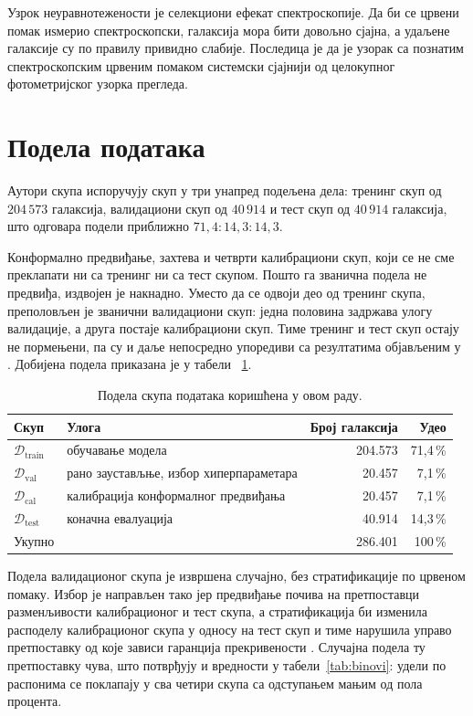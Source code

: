 \documentclass[12pt,oneside]{memoir}
\newcommand{\Dtrain}{\mathcal{D}_{\mathrm{train}}}
\newcommand{\Dval}{\mathcal{D}_{\mathrm{val}}}
\newcommand{\Dcal}{\mathcal{D}_{\mathrm{cal}}}
\newcommand{\Dtest}{\mathcal{D}_{\mathrm{test}}}
\begin{document}
Узрок неуравнотежености је селекциони ефекат спектроскопије. Да би се црвени помак 
иѕмерио спектроскопски, галаксија мора бити довољно сјајна, а удаљене галаксије су по 
правилу привидно слабије. Последица је да је узорак са познатим спектроскопским црвеним помаком
системски сјајнији од целокупног фотометријског узорка прегледа.

\section{Подела података}

Аутори скупа испоручују скуп у три унапред подељена дела: тренинг скуп од $204\,573$ галаксија,
валидациони скуп од $40\,914$ и тест скуп од $40\,914$ галаксија, што одговара подели приближно
$71{,}4 : 14{,}3 : 14{,}3$.

Конформално предвиђање, захтева и четврти калибрациони скуп, који се не сме преклапати ни са тренинг
ни са тест скупом. Пошто га званична подела не предвиђа, издвојен је накнадно. Уместо да 
се одвоји део од тренинг скупа, преполовљен је званични валидациони скуп: једна половина задржава 
улогу валидације, а друга постаје калибрациони скуп. Тиме тренинг и тест скуп остају не пормењени, па су и 
даље непосредно упоредиви са резултатима објављеним у \cite{jones2024a, jones2024b}. Добијена подела 
приказана је у табели ~\ref{tab:podela}.

\begin{table}[htbp]
\centering
\caption{Подела скупа података коришћена у овом раду.}
\label{tab:podela}
\begin{tabular}{llrr}
\toprule
Скуп & Улога & Број галаксија & Удео \\
\midrule
$\Dtrain$ & обучавање модела              & 204.573 & 71,4\,\% \\
$\Dval$   & рано заустављње, избор хиперпараметара &  20.457 &  7,1\,\% \\
$\Dcal$   & калибрација конформалног предвиђања      &  20.457 &  7,1\,\% \\
$\Dtest$  & коначна евалуација            &  40.914 & 14,3\,\% \\
\midrule
Укупно & & 286.401 & 100\,\% \\
\bottomrule
\end{tabular}
\end{table}

Подела валидационог скупа је извршена случајно, без стратификације по
црвеном помаку. Избор је направљен тако јер предвиђање почива на претпоставци 
разменљивости калибрационог и тест скупа, а стратификација би изменила расподелу 
калибрационог скупа у односу на тест скуп и тиме нарушила 
управо претпоставку од које зависи гаранција прекривености \cite{angelopoulos2023}. Случајна подела 
ту претпоставку чува, што потврђују и вредности у табели~\ref{tab:binovi}: удели по распонима се поклапају  
у сва четири скупа са одступањем мањим од пола процента.
\end{document}
